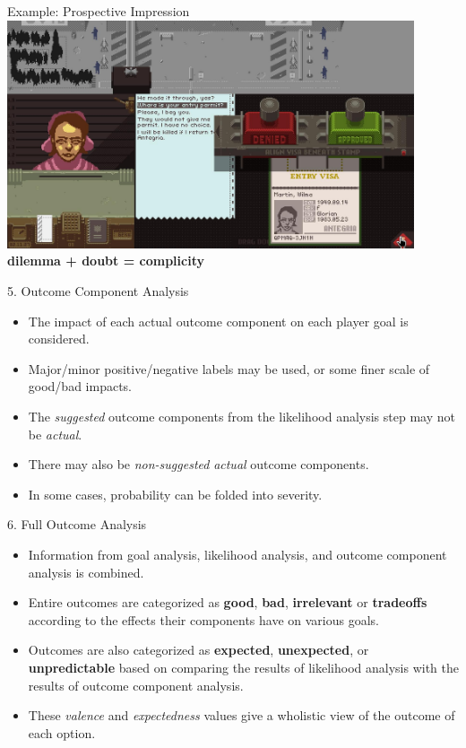 \documentclass[xcolor=x11names]{beamer}
\begin{document}
\begin{frame}{Example: Prospective Impression}
  \centering
  \includegraphics[width=0.9\textwidth]{res/papersplease-large.png} \\
  \vspace{1em}
  \pause
  \textbf{dilemma + doubt = complicity}
\end{frame}

\begin{frame}{5. Outcome Component Analysis}
  \begin{itemize}\addtolength{\itemsep}{0.5\baselineskip}
    \item The impact of each actual outcome component on each player goal is considered.
    \item Major/minor positive/negative labels may be used, or some finer scale of good/bad impacts.
    \item The \emph{suggested} outcome components from the likelihood analysis step may not be \emph{actual}.
    \item There may also be \emph{non-suggested} \emph{actual} outcome components.
    \item In some cases, probability can be folded into severity.
  \end{itemize}
\end{frame}

\begin{frame}{6. Full Outcome Analysis}
  \begin{itemize}\addtolength{\itemsep}{0.5\baselineskip}
    \item Information from goal analysis, likelihood analysis, and outcome component analysis is combined.
    \item Entire outcomes are categorized as \textbf{good}, \textbf{bad}, \textbf{irrelevant} or \textbf{tradeoffs} according to the effects their components have on various goals.
    \item Outcomes are also categorized as \textbf{expected}, \textbf{unexpected}, or \textbf{unpredictable} based on comparing the results of likelihood analysis with the results of outcome component analysis.
    \item These \emph{valence} and \emph{expectedness} values give a wholistic view of the outcome of each option.
  \end{itemize}
\end{frame}
\end{document}
